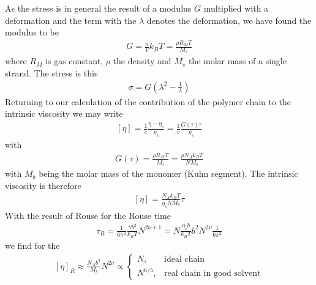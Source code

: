 \documentclass[letterpaper,10pt,english]{sphinxmanual}
\begin{document}
\sphinxAtStartPar
As the stress is in general the result of a modulus \(G\) multiplied with a deformation and the term with the \(\lambda\) denotes the deformation, we have found the modulus to be
\begin{equation*}
\begin{split}G=\frac{n}{V}k_B T=\frac{\rho R_M T}{M_s}\end{split}
\end{equation*}
\sphinxAtStartPar
where \(R_M\) is gas constant, \(\rho\) the density and \(M_s\) the molar mass of a single strand. The stress is this
\begin{equation*}
\begin{split}\sigma=G \left (\lambda^2-\frac{1}{\lambda}\right )\end{split}
\end{equation*}
\sphinxAtStartPar
Returning to our calculation of the contribution of the polymer chain to the intrinsic viscosity we may write
\begin{equation*}
\begin{split}[\eta]=\frac{1}{c}\frac{\eta-\eta_{s}}{\eta_{s}}=\frac{1}{c}\frac{G(\tau)\tau}{\eta_s}\end{split}
\end{equation*}
\sphinxAtStartPar
with
\begin{equation*}
\begin{split}G(\tau)=\frac{\rho R_M T}{M_s}=\frac{\rho N_A k_B T}{N M_b}\end{split}
\end{equation*}
\sphinxAtStartPar
with \(M_b\) being the molar mass of the monomer (Kuhn segment). The intrinsic viscosity is therefore
\begin{equation*}
\begin{split}[\eta]=\frac{N_A k_B T}{ \eta_s N M_b}\tau\end{split}
\end{equation*}
\sphinxAtStartPar
With the result of Rouse for the Rouse time
\begin{equation*}
\begin{split}\tau_R=\frac{1}{6 \pi^{2}} \frac{\gamma b^{2}}{k_{B} T} N^{2\nu+1}=N\frac{\eta_s b}{k_B T}b^2 N^{2\nu}\frac{1}{6\pi^2}\end{split}
\end{equation*}
\sphinxAtStartPar
we find for the 
\begin{equation*}
\begin{split}[\eta]_R \approx \frac{N_A b^3}{M_b}N^{2\nu}\propto
\begin{cases}
N, & \text{ideal chain}\\
N^{6/5},  & \text{real chain in good solvent}
\end{cases}\end{split}
\end{equation*}
\end{document}
